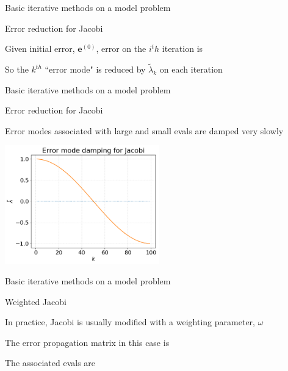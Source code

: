 \documentclass[18pt,xcolor=table]{beamer}
\begin{document}
\begin{frame}{Basic iterative methods on a model problem}
\begin{block}{Error reduction for Jacobi}
\bit
\item Given initial error, $\mathbf{e}^{(0)}$, error on the $i^th$ iteration is 
\item So the $k^{th}$ ``error mode" is reduced by $\tilde\lambda_k$ on each iteration
\eit
\end{block}
\end{frame}

\begin{frame}{Basic iterative methods on a model problem}
\begin{block}{Error reduction for Jacobi}
\bit
\item Error modes associated with large and small evals are damped very slowly
\eit
\end{block}
\begin{center}
\includegraphics[width=0.5\textwidth]{../figures/jacobiModeDamping} %
\end{center}
\end{frame}

\begin{frame}{Basic iterative methods on a model problem}
\begin{block}{Weighted Jacobi}
\bit
\item In practice, Jacobi is usually modified with a weighting parameter, $\omega$
\item The error propagation matrix in this case is
\item The associated evals are
\eit
\end{block}
\end{frame}
\end{document}
